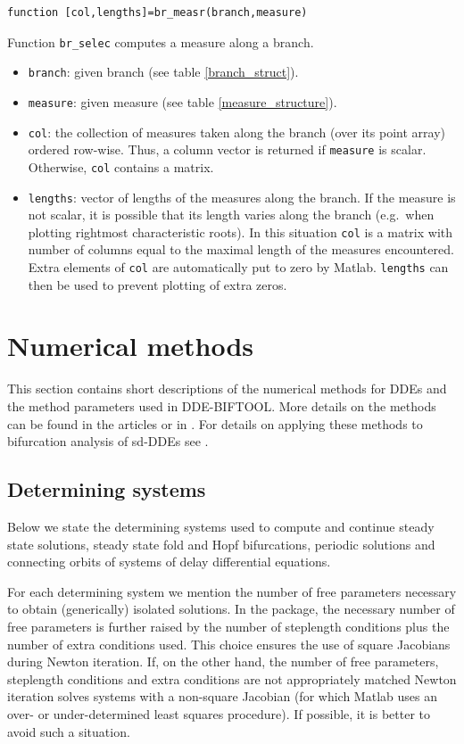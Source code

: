 \documentclass[10pt]{scrartcl}
\newcommand{\DDEBIFCODE}{\textsc{DDE-BIFTOOL}}
\newcommand{\blist}[1]{\mbox{\lstinline!#1!}}
\begin{document}
{\begin{lstlisting}
function [col,lengths]=br_measr(branch,measure)  
\end{lstlisting}
\noindent Function \blist{br_selec} computes a measure along a branch.
\begin{itemize}
\item \blist{branch}: given branch (see table \ref{branch_struct}).
\item \blist{measure}: given measure (see table \ref{measure_structure}).
\item \blist{col}: the collection of measures taken along the
branch (over its point array) ordered row-wise. Thus, a column vector
is returned if \blist{measure} is scalar. Otherwise,
\blist{col} contains a matrix.
\item \blist{lengths}: vector of lengths of the measures along the
  branch.  If the measure is not scalar, it is possible that its
  length varies along the branch (e.g.~when plotting rightmost
  characteristic roots). In this situation \blist{col} is a matrix
  with number of columns equal to the maximal length of the measures
  encountered.  Extra elements of \blist{col} are automatically put to
  zero by Matlab.  \blist{lengths} can then be used to prevent
  plotting of extra zeros.
\end{itemize}

\section{Numerical methods}\label{numerical_methods}\label{code_num_methods}
This section contains short descriptions of the numerical methods 
for DDEs and the method parameters used in {\DDEBIFCODE}. 
More details on the methods can be found in the
articles \cite{Luzy96,Enge99a,Enge99b,en_d01,engel01,homoclinic} 
or in \cite{Enge00}. For details on applying these methods to bifurcation
analysis of sd-DDEs see \cite{luz01}.

\subsection{Determining systems}\label{determining_systems}

Below we state the determining systems used to compute and
continue steady state solutions, steady state fold and Hopf 
bifurcations, periodic solutions and connecting orbits of systems of delay
differential equations.

For each determining system we mention the number of free 
parameters necessary to obtain (generically) isolated 
solutions. 
In the package,
the necessary number of free parameters
is further raised by the number of
steplength conditions plus the number of extra conditions used.
This choice ensures 
the use of square Jacobians during Newton iteration. 
If, on the other hand, the number of free parameters, 
steplength conditions and extra conditions
are not appropriately matched Newton iteration solves systems with a   
non-square Jacobian (for which Matlab uses an
over- or under-determined
least squares procedure). 
If possible, it is better to avoid such a situation.

}
\end{document}
